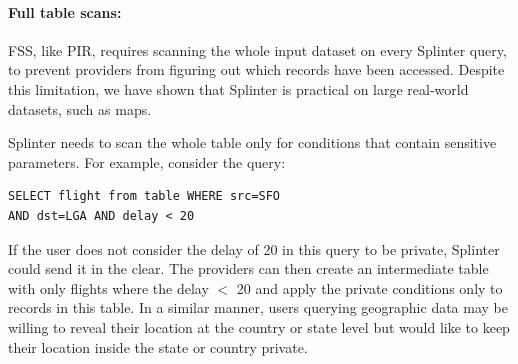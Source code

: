 

\paragraph{Full table scans:}
FSS, like PIR, requires scanning the whole input dataset on every Splinter query,
to prevent providers from figuring out which records have been accessed. 
Despite this limitation, we have shown that Splinter is practical
on large real-world datasets, such as maps.

Splinter needs to scan the whole table only for conditions 
that contain sensitive parameters.
For example, consider the query:
\begin{verbatim}
SELECT flight from table WHERE src=SFO 
AND dst=LGA AND delay < 20
\end{verbatim}
If the user does not consider the delay of 20 in this query to be
private, Splinter could send it in the clear.
The providers can then create an intermediate
table with only flights where the delay $<$ 20 and apply the private
conditions only to records in this table.
In a similar manner, users querying geographic data may be willing to
reveal their location at the country or state level but would like to
keep their location inside the state or country private.


